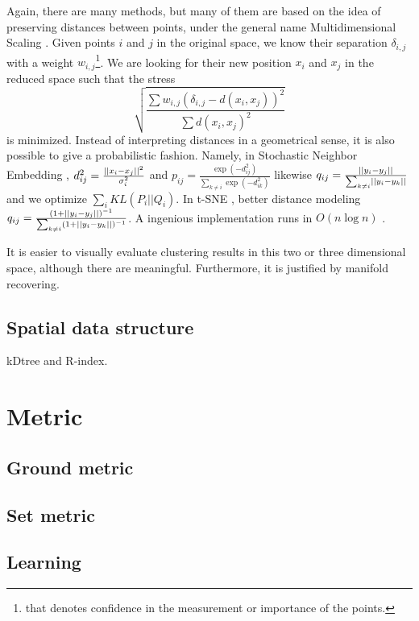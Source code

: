 Again, there are many methods, but many of them are based on the idea of preserving distances between points, under the general name Multidimensional Scaling \autocite{MDS77}. Given points $i$ and $j$ in the original space, we know their separation $\delta_{i,j}$ with a weight $w_{i,j}$\footnote{that denotes confidence in the measurement or importance of the points.}. We are looking for their new position $x_i$ and $x_j$ in the reduced space such that the stress \[
\sqrt{\frac{\sum w_{i,j}(\delta_{i,j} - d(x_i, x_j))^2}{\sum  d(x_i, x_j)^2}} \] is minimized. Instead of interpreting distances in a geometrical sense, it is also possible to give a probabilistic fashion. Namely, in Stochastic Neighbor Embedding \autocite{SNE02}, $d^2_{ij} = \frac{\left|\left|x_i - x_j\right|\right|^2}{\sigma^2_i}$  and
$p_{ij} = \frac{\exp(-d_{ij}^2)}{\sum_{k \neq i}\exp(-d_{ik}^2)}$ likewise
$q_{ij} = \frac{\left|\left|y_i - y_j\right|\right|}{\sum_{k \neq i}\left|\left|y_i - y_k\right|\right|}$ and we optimize $\sum_i KL(P_i || Q_i)$. In t-SNE \autocite{tSNE08}, better distance modeling
$q_{ij} = \frac{(1+\left|\left|y_i - y_j\right|\right|)^{-1}}{\sum_{k \neq i}(1+\left|\left|y_i - y_k\right|\right|)^{-1}}$. A ingenious implementation runs in $O(n\log n)$ \autocite{BarnesHut13}.

It is easier to visually evaluate clustering results in this two or three dimensional space, although there are meaningful. Furthermore, it is justified by manifold recovering.

\subsection{Spatial data structure}
kDtree and R-index.

\section{Metric}
\subsection{Ground metric}
\subsection{Set metric}
\subsection{Learning}
